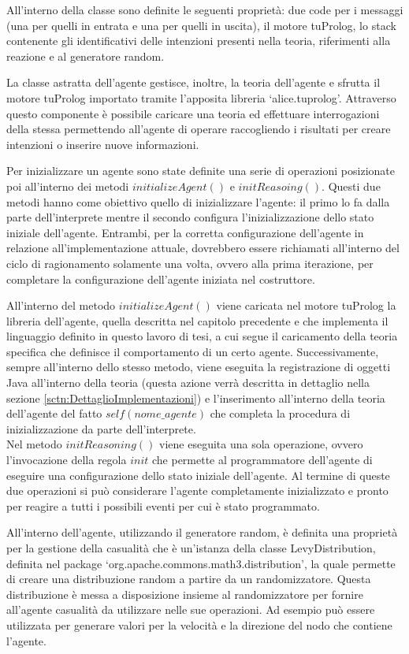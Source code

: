 All'interno della classe sono definite le seguenti proprietà: due code per i messaggi (una per quelli in entrata e una per quelli in uscita), il motore tuProlog, lo stack contenente gli identificativi delle intenzioni presenti nella teoria, riferimenti alla reazione e al generatore random.

La classe astratta dell'agente gestisce, inoltre, la teoria dell'agente e sfrutta il motore tuProlog importato tramite l'apposita libreria `alice.tuprolog'. Attraverso questo componente è possibile caricare una teoria ed effettuare interrogazioni della stessa permettendo all'agente di operare raccogliendo i risultati per creare intenzioni o inserire nuove informazioni.

Per inizializzare un agente sono state definite una serie di operazioni posizionate poi all'interno dei metodi $initializeAgent()$ e $initReasoing()$.
Questi due metodi hanno come obiettivo quello di inizializzare l'agente: il primo lo fa dalla parte dell'interprete mentre il secondo configura l'inizializzazione dello stato iniziale dell'agente.
Entrambi, per la corretta configurazione dell'agente in relazione all'implementazione attuale, dovrebbero essere richiamati all'interno del ciclo di ragionamento solamente una volta, ovvero alla prima iterazione, per completare la configurazione dell'agente iniziata nel costruttore.

All'interno del metodo $initializeAgent()$ viene caricata nel motore tuProlog la libreria dell'agente, quella descritta nel capitolo precedente e che implementa il linguaggio definito in questo lavoro di tesi, a cui segue il caricamento della teoria specifica che definisce il comportamento di un certo agente. Successivamente, sempre all'interno dello stesso metodo, viene eseguita la registrazione di oggetti Java all'interno della teoria (questa azione verrà descritta in dettaglio nella sezione \ref{sctn:DettaglioImplementazioni}) e l'inserimento all'interno della teoria dell'agente del fatto $self(nome\_agente)$ che completa la procedura di inizializzazione da parte dell'interprete.
\\
Nel metodo $initReasoning()$ viene eseguita una sola operazione, ovvero l'invocazione della regola $init$ che permette al programmatore dell'agente di eseguire una configurazione dello stato iniziale dell'agente.
Al termine di queste due operazioni si può considerare l'agente completamente inizializzato e pronto per reagire a tutti i possibili eventi per cui è stato programmato.

All'interno dell'agente, utilizzando il generatore random, è definita una proprietà per la gestione della casualità che è un'istanza della classe LevyDistribution, definita nel package `org.apache.commons.math3.distribution', la quale permette di creare una distribuzione random a partire da un randomizzatore. Questa distribuzione è messa a disposizione insieme al randomizzatore per fornire all'agente casualità da utilizzare nelle sue operazioni. Ad esempio può essere utilizzata per generare valori per la velocità e la direzione del nodo che contiene l'agente.

